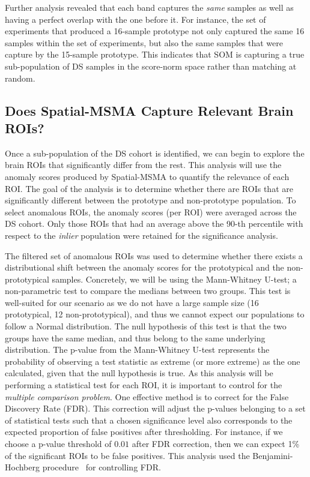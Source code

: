 Further analysis revealed that each band captures the \textit{same} samples as well as having a perfect overlap with the one before it. For instance, the set of experiments that produced a 16-sample prototype not only captured the same 16 samples within the set of experiments, but also the same samples that were capture by the 15-sample prototype. This indicates that SOM is capturing a true sub-population of DS samples in the score-norm space rather than matching at random.




\subsection*{Does Spatial-MSMA Capture Relevant Brain ROIs?}

Once a sub-population of the DS cohort is identified, we can begin to explore the brain ROIs that significantly differ from the rest.  This analysis will use the anomaly scores produced by Spatial-MSMA to quantify the relevance of each ROI. The goal of the analysis is to determine whether there are ROIs that are significantly different between the prototype and non-prototype population. To select anomalous ROIs, the anomaly scores (per ROI) were averaged across the DS cohort. Only those ROIs that had an average above the 90-th percentile with respect to the \textit{inlier} population were retained for the significance analysis.

The filtered set of anomalous ROIs was used to determine whether there exists a distributional shift between the anomaly scores for the prototypical and the non-prototypical samples. Concretely, we will be using the Mann-Whitney U-test; a non-parametric test to compare the medians between two groups. This test is well-suited for our scenario as we do not have a large sample size (16 prototypical, 12 non-prototypical), and thus we cannot expect our populations to follow a Normal distribution. The null hypothesis of this test is that the two groups have the same median, and thus belong to the same underlying distribution. The p-value from the Mann-Whitney U-test represents the probability of observing a test statistic as extreme (or more extreme) as the one calculated, given that the null hypothesis is true. As this analysis will be performing a statistical test for each ROI, it is important to control for the \textit{multiple comparison problem}. One effective method is to correct for the False Discovery Rate (FDR). This correction will adjust the p-values belonging to a set of statistical tests such that a chosen significance level also corresponds to the expected proportion of false positives after thresholding. For instance, if we choose a p-value threshold of $0.01$ after FDR correction, then we can expect 1\% of the significant ROIs to be false positives. This analysis used the Benjamini-Hochberg procedure~\cite{benjamini1995controlling} for controlling FDR.

